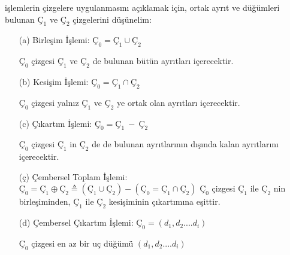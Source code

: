 \documentclass[fleqn]{book}
\begin{document}
    \setcounter{page}{6}
    
    \noindent işlemlerin çizgelere uygulanmasını açıklamak için, ortak ayrıt ve düğümleri bulunan $Ç_1$ ve  $Ç_2$ çizgelerini düşünelim:
    
    \begin{itemize}
        \item [(a) Birleşim İşlemi: ] $Ç_0 = Ç_1\cup Ç_2$
        
        $Ç_0$ çizgesi $Ç_1$ ve $Ç_2$ de bulunan bütün ayrıtları içerecektir.
        \item [(b) Kesişim İşlemi: ] $Ç_0 = Ç_1\cap Ç_2$
        
        $Ç_0$ çizgesi yalnız $Ç_1$ ve $Ç_2$ ye ortak olan ayrıtları içerecektir.
        \item [(c) Çıkartım İşlemi: ] $Ç_0 = Ç_1\ -\ Ç_2$
        
        $Ç_0$ çizgesi $Ç_1$ in $Ç_2$ de de bulunan ayrıtlarının dışında kalan ayrıtlarını içerecektir.
        \item [(ç) Çembersel Toplam İşlemi: ] $Ç_0 = Ç_1 \oplus Ç_2 \triangleq (Ç_1\cup 
        Ç_2) - (Ç_0 = Ç_1\cap Ç_2)$
        $Ç_0$ çizgesi $Ç_1$ ile $Ç_2$ nin birleşiminden, $Ç_1$ ile $Ç_2$ kesişiminin çıkartımına eşittir.
        \item [(d) Çembersel Çıkartım İşlemi: ] $Ç_0 = (d_1, d_2....d_i)$
        
        $Ç_0$ çizgesi en az bir uç düğümü $(d_1, d_2....d_i)$
    \end{itemize}
\end{document}
